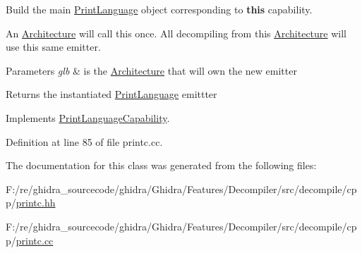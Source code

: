 Build the main \mbox{\hyperlink{class_print_language}{Print\+Language}} object corresponding to {\bfseries{this}} capability. 

An \mbox{\hyperlink{class_architecture}{Architecture}} will call this once. All decompiling from this \mbox{\hyperlink{class_architecture}{Architecture}} will use this same emitter. 
\begin{DoxyParams}{Parameters}
{\em glb} & is the \mbox{\hyperlink{class_architecture}{Architecture}} that will own the new emitter \\
\hline
\end{DoxyParams}
\begin{DoxyReturn}{Returns}
the instantiated \mbox{\hyperlink{class_print_language}{Print\+Language}} emittter 
\end{DoxyReturn}


Implements \mbox{\hyperlink{class_print_language_capability_a50e2abb3f0b4cf3ab67556f77eacc51e}{Print\+Language\+Capability}}.



Definition at line 85 of file printc.\+cc.



The documentation for this class was generated from the following files\+:\begin{DoxyCompactItemize}
\item 
F\+:/re/ghidra\+\_\+sourcecode/ghidra/\+Ghidra/\+Features/\+Decompiler/src/decompile/cpp/\mbox{\hyperlink{printc_8hh}{printc.\+hh}}\item 
F\+:/re/ghidra\+\_\+sourcecode/ghidra/\+Ghidra/\+Features/\+Decompiler/src/decompile/cpp/\mbox{\hyperlink{printc_8cc}{printc.\+cc}}\end{DoxyCompactItemize}
